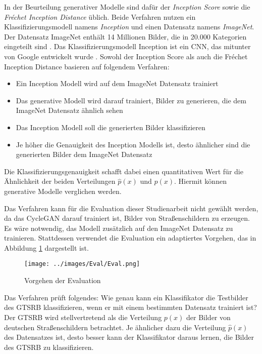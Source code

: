 In der Beurteilung generativer Modelle sind dafür der \emph{Inception Score} sowie die \emph{Fréchet Inception Distance} üblich. Beide Verfahren nutzen ein Klassifizierungsmodell namens \emph{Inception} und einen Datensatz namens \emph{ImageNet}. Der Datensatz ImageNet enthält 14 Millionen Bilder, die in 20.000 Kategorien eingeteilt sind \cite{imagenet}. Das Klassifizierungsmodell Inception ist ein \ac{CNN}, das mitunter von Google entwickelt wurde \cite{inception}. Sowohl der Inception Score als auch die Fréchet Inception Distance basieren auf folgendem Verfahren: \cite{generative-models-evaluation}
\begin{itemize}
	\item Ein Inception Modell wird auf dem ImageNet Datensatz trainiert
	\item Das generative Modell wird darauf trainiert, Bilder zu generieren, die dem ImageNet Datensatz ähnlich sehen
	\item Das Inception Modell soll die generierten Bilder klassifizieren
	\item Je höher die Genauigkeit des Inception Modells ist, desto ähnlicher sind die generierten Bilder dem ImageNet Datensatz
\end{itemize}
Die Klassifizierungsgenauigkeit schafft dabei einen quantitativen Wert für die Ähnlichkeit der beiden Verteilungen $\hat{p}(x)$ und $p(x)$. Hiermit können generative Modelle verglichen werden.

Das Verfahren kann für die Evaluation dieser Studienarbeit nicht gewählt werden, da das \ac{CycleGAN} darauf trainiert ist, Bilder von Straßenschildern zu erzeugen. Es wäre notwendig, das Modell zusätzlich auf den ImageNet Datensatz zu trainieren. Stattdessen verwendet die Evaluation ein adaptiertes Vorgehen, das in Abbildung \ref{fig:eval} dargestellt ist.

\begin{figure}[h]
	\centering
	\texttt{[image: ../images/Eval/Eval.png]}
	\caption{Vorgehen der Evaluation}
	\label{fig:eval}
\end{figure}

Das Verfahren prüft folgendes: Wie genau kann ein Klassifikator die Testbilder des \ac{GTSRB} klassifizieren, wenn er mit einem bestimmten Datensatz trainiert ist? Der \ac{GTSRB} wird stellvertretend als die Verteilung $p(x)$ der Bilder von deutschen Straßenschildern betrachtet. Je ähnlicher dazu die Verteilung $\hat{p}(x)$ des Datensatzes ist, desto besser kann der Klassifikator daraus lernen, die Bilder des \ac{GTSRB} zu klassifizieren.

